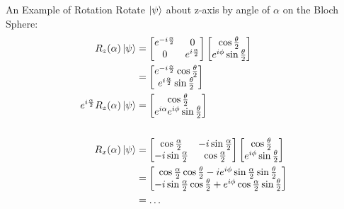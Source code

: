 \documentclass{beamer}
\begin{document}
\begin{frame}{An Example of Rotation\tiny\cite{rotationsonblochsphere}}
  {\tiny
    Rotate $\ket\psi$ about z-axis by angle of $\alpha$ on the Bloch Sphere:
  \begin{align*}
    R_z(\alpha)\ket{\psi} &= \begin{bmatrix}
                                e^{-i\frac{\alpha}2} & 0 \\
                                0                    & e^{i\frac{\alpha}2}
                              \end{bmatrix}
                              \begin{bmatrix}
                                \cos{\frac{\theta}2} \\
                                e^{i\phi}\sin{\frac{\theta}2}
                              \end{bmatrix} \\
                          &= \begin{bmatrix}
                               e^{-i\frac{\alpha}2}\cos{\frac{\theta}2} \\
                               e^{i\frac{\alpha}2}\sin{\frac{\theta}2}
                             \end{bmatrix} \\
     e^{i\frac{\alpha}2}R_z(\alpha)\ket{\psi}
                          &= \begin{bmatrix}
                               \cos{\frac{\theta}2} \\
                               e^{i\alpha}e^{i\phi}\sin{\frac{\theta}2}
                             \end{bmatrix} \\
    \\
    R_x(\alpha)\ket{\psi} &= \begin{bmatrix}
                              \cos\frac{\alpha}2 & -i\sin\frac{\alpha}2 \\
                              -i\sin\frac{\alpha}2 & \cos\frac{\alpha}2
                             \end{bmatrix}
                             \begin{bmatrix}
                               \cos{\frac{\theta}2} \\
                               e^{i\phi}\sin{\frac{\theta}2}
                             \end{bmatrix} \\
                             &= \begin{bmatrix}
                               \cos\frac{\alpha}2 \cos\frac{\theta}2 - i e^{i\phi} \sin\frac{\alpha}2 \sin\frac{\theta}2 \\
                               -i \sin\frac{\alpha}2 \cos\frac{\theta}2 + e^{i\phi} \cos\frac{\alpha}2 \sin\frac{\theta}2
                                \end{bmatrix} \\
                             &= \dots
  \end{align*}
  }%
\end{frame}
\end{document}
